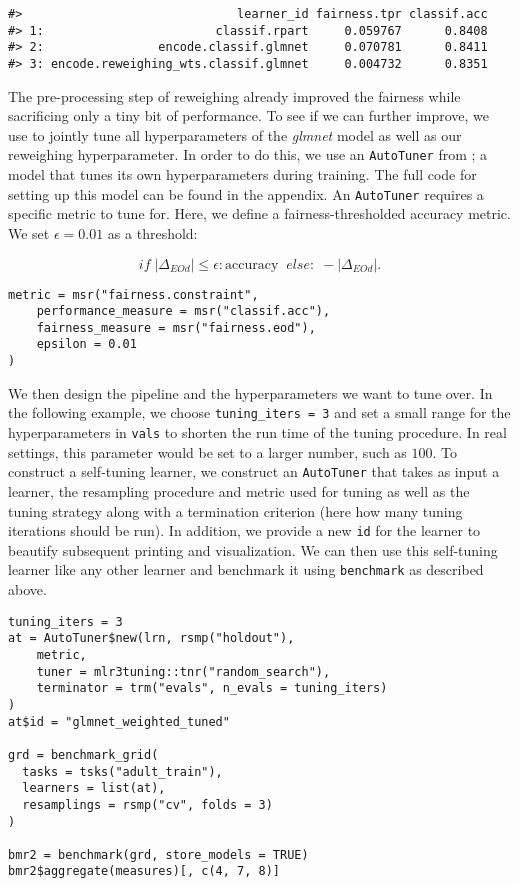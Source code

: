 \begin{verbatim}
#>                              learner_id fairness.tpr classif.acc
#> 1:                        classif.rpart     0.059767      0.8408
#> 2:                encode.classif.glmnet     0.070781      0.8411
#> 3: encode.reweighing_wts.classif.glmnet     0.004732      0.8351
\end{verbatim}

The pre-processing step of reweighing already improved the fairness while sacrificing only a tiny bit of performance.
To see if we can further improve, we use  to jointly tune all hyperparameters of the \emph{glmnet} model as well as our reweighing hyperparameter.
In order to do this, we use an \texttt{AutoTuner} from ; a model that tunes its own hyperparameters during training.
The full code for setting up this model can be found in the appendix.
An \texttt{AutoTuner} requires a specific metric to tune for.
Here, we define a fairness-thresholded accuracy metric. We set \(\epsilon = 0.01\) as a threshold:

\[
  if \; |\Delta_{EOd}| \leq \epsilon: \textrm{accuracy} \;\; else: \;  - |\Delta_{EOd}|.
\]

\begin{verbatim}
metric = msr("fairness.constraint",
    performance_measure = msr("classif.acc"),
    fairness_measure = msr("fairness.eod"),
    epsilon = 0.01
)
\end{verbatim}

We then design the pipeline and the hyperparameters we want to tune over.
In the following example, we choose \texttt{tuning\_iters\ =\ 3} and set a small range for the hyperparameters in \texttt{vals} to shorten the run time of the tuning procedure.
In real settings, this parameter would be set to a larger number, such as \(100\).
To construct a self-tuning learner, we construct an \texttt{AutoTuner} that takes as input a learner, the resampling procedure and metric used for tuning as well as the tuning strategy along with a termination criterion (here how many tuning iterations should be run).
In addition, we provide a new \texttt{id} for the learner to beautify subsequent printing and visualization.
We can then use this self-tuning learner like any other learner and benchmark it using \texttt{benchmark} as described above.

\begin{verbatim}
tuning_iters = 3
at = AutoTuner$new(lrn, rsmp("holdout"),
    metric,
    tuner = mlr3tuning::tnr("random_search"),
    terminator = trm("evals", n_evals = tuning_iters)
)
at$id = "glmnet_weighted_tuned"

grd = benchmark_grid(
  tasks = tsks("adult_train"),
  learners = list(at),
  resamplings = rsmp("cv", folds = 3)
)

bmr2 = benchmark(grd, store_models = TRUE)
bmr2$aggregate(measures)[, c(4, 7, 8)]
\end{verbatim}

